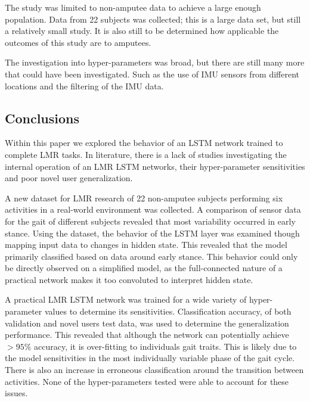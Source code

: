 The study was limited to non-amputee data to achieve a large enough population. Data from 22 subjects was collected; this is a large data set, but still a relatively small study. It is also still to be determined how applicable the outcomes of this study are to amputees.

The investigation into hyper-parameters was broad, but there are still many more that could have been investigated. Such as the use of IMU sensors from different locations and the filtering of the IMU data.


\subsection{Conclusions}
\label{sec:conclusion}
Within this paper we explored the behavior of an LSTM network trained to complete LMR tasks. In literature, there is a lack of studies investigating the internal operation of an LMR LSTM networks, their hyper-parameter sensitivities and poor novel user generalization.

A new dataset for LMR research of 22 non-amputee subjects performing six activities in a real-world environment was collected. A comparison of sensor data for the gait of different subjects revealed that most variability occurred in early stance. Using the dataset, the behavior of the LSTM layer was examined though mapping input data to changes in hidden state. This revealed that the model primarily classified based on data around early stance. This behavior could only be directly observed on a simplified model, as the full-connected nature of a practical network makes it too convoluted to interpret hidden state.

A practical LMR LSTM network was trained for a wide variety of hyper-parameter values to determine its sensitivities. Classification accuracy, of both validation and novel users test data, was used to determine the generalization performance. This revealed that although the network can potentially achieve $>95\%$ accuracy, it is over-fitting to individuals gait traits. This is likely due to the model sensitivities in the most individually variable phase of the gait cycle. There is also an increase in erroneous classification around the transition between activities. None of the hyper-parameters tested were able to account for these issues.

